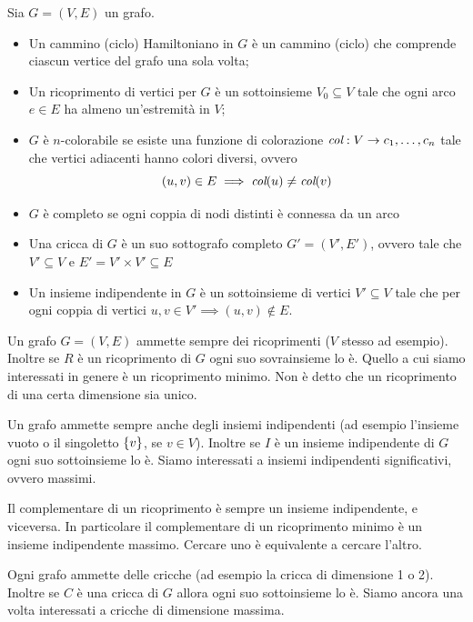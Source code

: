 \begin{defn}
    Sia $G = (V,E)$ un grafo.
    \begin{itemize}
        \item Un cammino (ciclo) Hamiltoniano in $G$ è un cammino (ciclo) che comprende ciascun
        vertice del grafo una sola volta;
        \item Un ricoprimento di vertici per $G$ è un sottoinsieme $V_{0} \subseteq V$ tale che
        ogni arco $e \in E$ ha almeno un'estremità in $V$;
        \item $G$ è $n$-colorabile se esiste una funzione di colorazione $\textit{col}: V \to
        c_{1},\dotsc,c_{n}$ tale che vertici adiacenti hanno colori diversi, ovvero
        \begin{equation*}
            (u,v) \in E \implies \textit{col}(u) \not= \textit{col}(v)
        \end{equation*}
        \item $G$ è completo se ogni coppia di nodi distinti è connessa da un arco
        \item Una cricca di $G$ è un suo sottografo completo $G' = (V',E')$, ovvero tale che $V'
        \subseteq V$ e $E' = V' \times V' \subseteq E$
        \item Un insieme indipendente in $G$ è un sottoinsieme di vertici $V' \subseteq V$ tale che
        per ogni coppia di vertici $u,v \in V' \implies (u,v) \notin E$.
    \end{itemize}
\end{defn}

Un grafo $G=(V,E)$ ammette sempre dei ricoprimenti ($V$ stesso ad esempio). Inoltre se $R$ è un
ricoprimento di $G$ ogni suo sovrainsieme lo è. Quello a cui siamo interessati in genere è un ricoprimento
minimo. Non è detto che un ricoprimento di una certa dimensione sia unico.

Un grafo ammette sempre anche degli insiemi indipendenti (ad esempio l'insieme vuoto o il singoletto
$\left\{v\right\}$, se $v \in V$). Inoltre se $I$ è un insieme indipendente di $G$ ogni suo sottoinsieme lo
è. Siamo interessati a insiemi indipendenti significativi, ovvero massimi.

Il complementare di un ricoprimento è sempre un insieme indipendente, e viceversa. In particolare il
complementare di un ricoprimento minimo è un insieme indipendente massimo. Cercare uno è
equivalente a cercare l'altro.

Ogni grafo ammette delle cricche (ad esempio la cricca di dimensione 1 o 2). Inoltre se $C$ è una
cricca di $G$ allora ogni suo sottoinsieme lo è. Siamo ancora una volta interessati a cricche di
dimensione massima.

